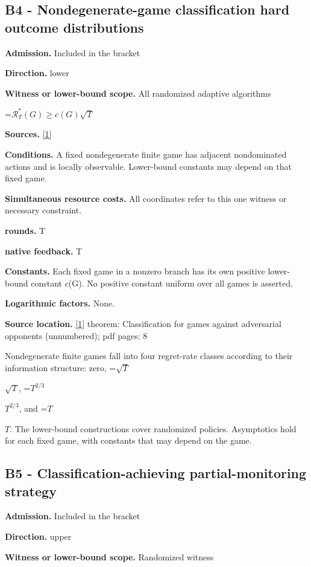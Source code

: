 \documentclass[10pt,a4paper]{article}
\newcommand{\AtlasMath}[1]{\par\begingroup\centering\setbox0=\hbox{$\displaystyle #1$}\ifdim\wd0>1.4\linewidth\typeout{ATLAS WIDE FORMULA: \the\wd0}\fi\ifdim\wd0>\linewidth\resizebox{\linewidth}{!}{\box0}\else\box0\fi\par\endgroup}
\newcommand{\AtlasInlineMath}[1]{\begingroup\setbox0=\hbox{$#1$}\ifdim\wd0>.4\linewidth\endgroup\AtlasMath{#1}\else\endgroup$#1$\fi}
\begin{document}
\subsection{B4 - Nondegenerate-game classification hard outcome distributions}
\textbf{Admission.} Included in the bracket

\textbf{Direction.} lower

\textbf{Witness or lower-bound scope.} All randomized adaptive algorithms

\AtlasMath{\mathcal{R}_T^*(G)\ge c(G)\sqrt T}
\textbf{Sources.} \href{https://sites.ualberta.ca/~szepesva/papers/partial_monitoring-mor.pdf}{[1]}

\textbf{Conditions.} A fixed nondegenerate finite game has adjacent nondominated actions and is locally observable. Lower-bound constants may depend on that fixed game.

\textbf{Simultaneous resource costs.} All coordinates refer to this one witness or necessary constraint.

\textbf{rounds.} T

\textbf{native feedback.} T

\textbf{Constants.} Each fixed game in a nonzero branch has its own positive lower-bound constant c(G). No positive constant uniform over all games is asserted.

\textbf{Logarithmic factors.} None.

\textbf{Source location.} \href{https://sites.ualberta.ca/~szepesva/papers/partial_monitoring-mor.pdf}{[1]} theorem: Classification for games against adversarial opponents (unnumbered); pdf pages: 8

Nondegenerate finite games fall into four regret-rate classes according to their information structure: zero, \AtlasInlineMath{\sqrt T}, \AtlasInlineMath{T^{2/3}}, and \AtlasInlineMath{T}. The lower-bound constructions cover randomized policies. Asymptotics hold for each fixed game, with constants that may depend on the game.

\subsection{B5 - Classification-achieving partial-monitoring strategy}
\textbf{Admission.} Included in the bracket

\textbf{Direction.} upper

\textbf{Witness or lower-bound scope.} Randomized witness
\end{document}
